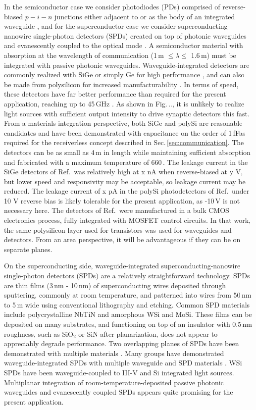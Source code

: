 \documentclass[twocolumn]{article}
\begin{document}
In the semiconductor case we consider photodiodes (PDs) comprised of reverse-biased $p-i-n$ junctions either adjacent to or as the body of an integrated waveguide \cite{}, and for the superconductor case we consider superconducting-nanowire single-photon detectors (SPDs) created on top of photonic waveguides and evanescently coupled to the optical mode \cite{}. A semiconductor material with absorption at the wavelength of communication (1\,\textmu m $\le \lambda \le$ 1.6\,\textmu m) must be integrated with passive photonic waveguides. Waveguide-integrated detectors are commonly realized with SiGe or simply Ge for high performance \cite{}, and can also be made from polysilicon for increased manufacturability \cite{}. In terms of speed, these detectors have far better performance than required for the present application, reaching up to 45\,GHz \cite{}. As shown in Fig.\,.., it is unlikely to realize light sources with sufficient output intensity to drive synaptic detectors this fast. From a materials integration perspective, both SiGe and polySi are reasonable candidates and have been demonstrated with capacitance on the order of 1\,fF\textemdash as required for the receiverless concept described in Sec.\,\ref{sec:communication}. The detectors can be as small as 4\,\textmu m in length while maintaining sufficient absorption and fabricated with a maximum temperature of 660\,\textcelsius \cite{}. The leakage current in the SiGe detectors of Ref.\,\cite{} was relatively high at x nA when reverse-biased at y V, but lower speed and responsivity may be acceptable, so leakage current may be reduced. The leakage current of x pA in the polySi photodetectors of Ref.\,\cite{} under 10 V reverse bias is likely tolerable for the present application, as -10\,V is not necessary here. The detectors of Ref.\,\cite{} were manufactured in a bulk CMOS electronics process, fully integrated with MOSFET control circuits. In that work, the same polysilicon layer used for transistors was used for waveguides and detectors. From an area perspective, it will be advantageous if they can be on separate planes.

On the superconducting side, waveguide-integrated superconducting-nanowire single-photon detectors (SPDs) are a relatively straightforward technology. SPDs are thin films (3\,nm - 10\,nm) of superconducting wires deposited through sputtering, commonly at room temperature, and patterned into wires from 50\,nm to 5\,\textmu m wide using conventional lithography and etching. Common SPD materials include polycrystalline NbTiN and amorphous WSi and MoSi. These films can be deposited on many substrates, and functioning on top of an insulator with 0.5\,nm roughness, such as SiO$_2$ or SiN after planarization, does not appear to appreciably degrade performance. Two overlapping planes of SPDs have been demonstrated with multiple materials \cite{}. Many groups have demonstrated waveguide-integrated SPDs with multiple waveguide and SPD materials \cite{}. WSi SPDs have been waveguide-coupled to III-V and Si integrated light sources. Multiplanar integration of room-temperature-deposited passive photonic waveguides and evanescently coupled SPDs appears quite promising for the present application.
\end{document}
